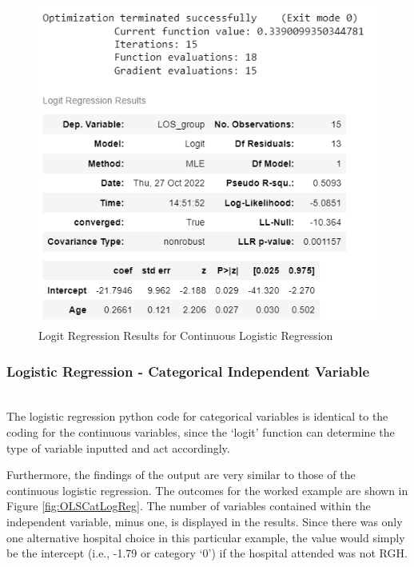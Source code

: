 \documentclass[../thesis.tex]{subfiles}
\begin{document}
\begin{figure}[h!]
    \centering
    \includegraphics{Chapters/Chapter3New/Figures/Logit_cont_results.png}
    \caption{Logit Regression Results for Continuous Logistic Regression}
    \label{fig:OLSConLogReg}
\end{figure}




\subsubsection{Logistic Regression - Categorical Independent Variable}\\
The logistic regression python code for categorical variables is identical to the coding for the continuous variables, since the `logit' function can determine the type of variable inputted and act accordingly.

Furthermore, the findings of the output are very similar to those of the continuous logistic regression. The outcomes for the worked example are shown in Figure \ref{fig:OLSCatLogReg}. The number of variables contained within the independent variable, minus one, is displayed in the results. Since there was only one alternative hospital choice in this particular example, the value would simply be the intercept (i.e., -1.79 or category `0') if the hospital attended was not RGH.
\end{document}

